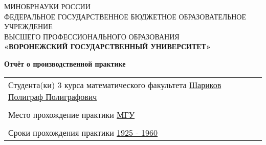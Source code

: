 \thispagestyle{empty}
\begin{center}
	\hfill \break
	\large{МИНОБРНАУКИ РОССИИ}\\
	\footnotesize{ФЕДЕРАЛЬНОЕ ГОСУДАРСТВЕННОЕ БЮДЖЕТНОЕ ОБРАЗОВАТЕЛЬНОЕ УЧРЕЖДЕНИЕ}\\
	\footnotesize{ВЫСШЕГО ПРОФЕССИОНАЛЬНОГО ОБРАЗОВАНИЯ}\\
	\small{\textbf{«ВОРОНЕЖСКИЙ ГОСУДАРСТВЕННЫЙ УНИВЕРСИТЕТ»}}\\

	\hfill \break
	\hfill \break
	\hfill \break
	\hfill \break
	\hfill \break
	\hfill \break
	\hfill \break
	\hfill \break
	\hfill \break

	\large\textbf{Отчёт о производственной практике}\\
\end{center}

\hfill \break
\hfill \break
\hfill \break
\hfill \break
\hfill \break
\hfill \break
\hfill \break


\begin{tabular}{p{}}
	Студента(ки) 3 курса математического факультета \newline
	\underline{Шариков Полиграф Полиграфович} \\
	\\
	Место прохождение практики
	\underline{МГУ}                              \\
	\\
	Сроки прохождения практики \underline{1925 - 1960}
\end{tabular}

\hfill \break
\hfill \break
\hfill \break
\hfill \break
\hfill \break
\hfill \break
\hfill \break
\hfill \break
\hfill \break
\hfill \break
\hfill \break

\newpage
